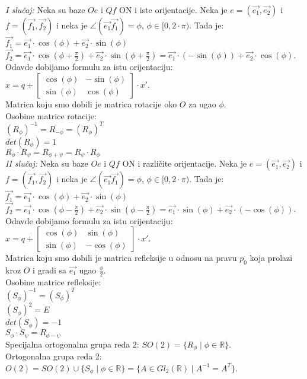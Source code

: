 \documentclass[12pt]{article}
\newcommand{\vek}[1]{\overrightarrow{#1}}
\begin{document}
\textit{I slučaj:} Neka su baze $Oe$ i $Qf$ ON i iste orijentacije. Neka je $e=(\vek{e_1},\vek{e_2})$
i $f=(\vek{f_1},\vek{f_2})$ i neka je $\angle(\vek{e_1}\vek{f_1})=\phi$, $\phi\in[0,2\cdot\pi)$.
Tada je:\\
$\vek{f_1}=\vek{e_1}\cdot\cos(\phi)+\vek{e_2}\cdot\sin(\phi)$\\
$\vek{f_2}=\vek{e_1}\cdot\cos(\phi+\frac{\pi}{2})+\vek{e_2}\cdot\sin(\phi+\frac{\pi}{2})=\vek{e_1}\cdot(-\sin(\phi))+\vek{e_2}\cdot\cos(\phi)$.\\
Odavde dobijamo formulu za istu orijentaciju: $x=q+\begin{bmatrix}
        \cos(\phi) & -\sin(\phi) \\
        \sin(\phi) & \cos(\phi)
    \end{bmatrix}\cdot x'$.\\
Matrica koju smo dobili je matrica rotacije oko $O$ za ugao $\phi$.\\
Osobine matrice rotacije:\\
$(R_\phi)^{-1}=R_{-\phi}=(R_\phi)^T$\\
$det(R_\phi)=1$\\
$R_\phi\cdot R_\psi=R_{\phi+\psi}=R_\psi\cdot R_\phi$\\
\textit{II slučaj:} Neka su baze $Oe$ i $Qf$ ON i različite orijentacije. Neka je $e=(\vek{e_1},\vek{e_2})$
i $f=(\vek{f_1},\vek{f_2})$ i neka je $\angle(\vek{e_1}\vek{f_1})=\phi$, $\phi\in[0,2\cdot\pi)$.
Tada je:\\
$\vek{f_1}=\vek{e_1}\cdot\cos(\phi)+\vek{e_2}\cdot\sin(\phi)$\\
$\vek{f_2}=\vek{e_1}\cdot\cos(\phi-\frac{\pi}{2})+\vek{e_2}\cdot\sin(\phi-\frac{\pi}{2})=\vek{e_1}\cdot\sin(\phi)+\vek{e_2}\cdot(-\cos(\phi))$.\\
Odavde dobijamo formulu za istu orijentaciju: $x=q+\begin{bmatrix}
        \cos(\phi) & \sin(\phi)  \\
        \sin(\phi) & -\cos(\phi)
    \end{bmatrix}\cdot x'$.\\
Matrica koju smo dobili je matrica refleksije u odnosu na pravu $p_0$ koja
prolazi kroz $O$ i gradi sa $\vek{e_1}$ ugao $\frac{\phi}{2}$.\\
Osobine matrice refleksije:\\
$(S_\phi)^{-1}=(S_\phi)^T$\\
$(S_\phi)^{2}=E$\\
$det(S_\phi)=-1$\\
$S_\phi\cdot S_\psi=R_{\phi-\psi}$\\
Specijalna ortogonalna grupa reda 2: $SO(2)=\{R_\phi\mid\phi\in\mathbb{R}\}$.\\
Ortogonalna grupa reda 2: $O(2)=SO(2)\cup\{S_\phi\mid\phi\in\mathbb{R}\}=\{A\in Gl_2(\mathbb{R})\mid A^{-1}=A^T\}$.
\end{document}
